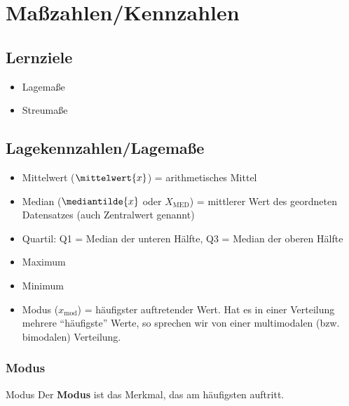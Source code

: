 
\section{Maßzahlen/Kennzahlen}

\subsection*{Lernziele}

\begin{itemize}
\item Lagemaße
\item Streumaße
\end{itemize}
\newpage

\subsection{Lagekennzahlen/Lagemaße}
\begin{itemize}
\item Mittelwert ($\mittelwert{x}$) = arithmetisches Mittel
\item Median ($\mediantilde{x}$ oder $X_{\text{MED}}$) = mittlerer Wert des geordneten Datensatzes (auch Zentralwert genannt)
\item Quartil: Q1 = Median der unteren Hälfte, Q3 =
  Median der oberen Hälfte
  
\item Maximum
\item Minimum

\item Modus ($x_{\text{mod}}$) = häufigster auftretender Wert. Hat es in einer Verteilung mehrere ``häufigste'' Werte, so sprechen wir von einer multimodalen (bzw. bimodalen) Verteilung.\end{itemize}

\subsubsection{Modus}
\begin{definition}{Modus}{}
  Der \textbf{Modus} ist das Merkmal, das am häufigsten auftritt.
\end{definition}

